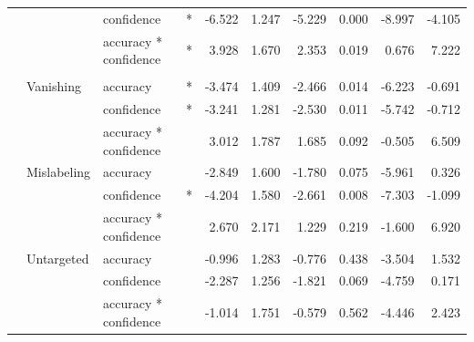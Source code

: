 \begin{longtable}[t]{llllrrrrrr}
\cmidrule{3-10}\nopagebreak
\hspace{1em} &  & confidence & * & -6.522 & 1.247 & -5.229 & 0.000 & -8.997 & -4.105\\
\cmidrule{3-10}\nopagebreak
\hspace{1em} &  & accuracy * confidence & * & 3.928 & 1.670 & 2.353 & 0.019 & 0.676 & 7.222\\
\cmidrule{1-10}\pagebreak[0]
\addlinespace[0.3em]
\multicolumn{10}{l}{\textbf{Cascade R-CNN}}\\
\hspace{1em} & Vanishing & accuracy & * & -3.474 & 1.409 & -2.466 & 0.014 & -6.223 & -0.691\\
\cmidrule{3-10}\nopagebreak
\hspace{1em} &  & confidence & * & -3.241 & 1.281 & -2.530 & 0.011 & -5.742 & -0.712\\
\cmidrule{3-10}\nopagebreak
\hspace{1em} &  & accuracy * confidence &  & 3.012 & 1.787 & 1.685 & 0.092 & -0.505 & 6.509\\
\cmidrule{2-10}\nopagebreak
\hspace{1em} & Mislabeling & accuracy &  & -2.849 & 1.600 & -1.780 & 0.075 & -5.961 & 0.326\\
\cmidrule{3-10}\nopagebreak
\hspace{1em} &  & confidence & * & -4.204 & 1.580 & -2.661 & 0.008 & -7.303 & -1.099\\
\cmidrule{3-10}\nopagebreak
\hspace{1em} &  & accuracy * confidence &  & 2.670 & 2.171 & 1.229 & 0.219 & -1.600 & 6.920\\
\cmidrule{2-10}\nopagebreak
\hspace{1em} & Untargeted & accuracy &  & -0.996 & 1.283 & -0.776 & 0.438 & -3.504 & 1.532\\
\cmidrule{3-10}\nopagebreak
\hspace{1em} &  & confidence &  & -2.287 & 1.256 & -1.821 & 0.069 & -4.759 & 0.171\\
\cmidrule{3-10}\nopagebreak
\hspace{1em} &  & accuracy * confidence &  & -1.014 & 1.751 & -0.579 & 0.562 & -4.446 & 2.423\\
\bottomrule
\end{longtable}
\endgroup{}


